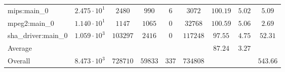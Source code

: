 \begin{tabular}{|l|c|c|c|c|c|c|c|c|}
mips:main\_0            & $ 2.475 \cdot 10^{1} $ & $ 2480   $ & $ 990   $ & $ 6   $ & $ 3072   $ & $ 100.19      $ & $ 5.02    $ & $ 5.09    $ \\
mpeg2:main\_0           & $ 1.140 \cdot 10^{1} $ & $ 1147   $ & $ 1065  $ & $ 0   $ & $ 32768  $ & $ 100.59      $ & $ 5.06    $ & $ 2.69    $ \\
sha\_driver:main\_0     & $ 1.059 \cdot 10^{3} $ & $ 103297 $ & $ 2416  $ & $ 0   $ & $ 117248 $ & $ 97.55       $ & $ 4.75    $ & $ 52.31   $ \\
\hline
Average                 & $                    $ & $        $ & $       $ & $     $ & $        $ & $ 87.24       $ & $ 3.27    $ & $         $ \\
\hline
Overall                 & $ 8.473 \cdot 10^{3} $ & $ 728710 $ & $ 59833 $ & $ 337 $ & $ 734808 $ & $             $ & $         $ & $ 543.66  $ \\
\hline
\end{tabular}
